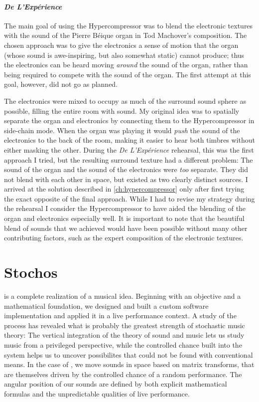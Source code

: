 \paragraph{\textit{De L'Exp\'{e}rience}}
The main goal of using the Hypercompressor was to blend the electronic
textures with the sound of the Pierre B\'{e}ique organ in Tod
Machover's composition. The chosen approach was to give the
electronics a sense of motion that the organ (whose sound is
awe-inspiring, but also somewhat static) cannot produce; thus the
electronics can be heard moving \emph{around} the sound of the organ,
rather than being required to compete with the sound of the organ.
The first attempt at this goal, however, did not go as planned.

The electronics were mixed to occupy as much of the surround sound
sphere as possible, filling the entire room with sound.  My original
idea was to spatially separate the organ and electronics by connecting
them to the Hypercompressor in side-chain mode.  When the organ was
playing it would \emph{push} the sound of the electronics to the back
of the room, making it easier to hear both timbres without either
masking the other.  During the \textit{De L'Exp\'{e}rience} rehearsal,
this was the first approach I tried, but the resulting surround
texture had a different problem: The sound of the organ and the sound
of the electronics were \emph{too} separate. They did not blend with
each other in space, but existed as two clearly distinct sources. I
arrived at the solution described in \autoref{ch:hypercompressor} only
after first trying the exact opposite of the final approach. While I
had to revise my strategy during the rehearsal I consider the
Hypercompressor to have aided the blending of the organ and
electronics especially well. It is important to note that the
beautiful blend of sounds that we achieved would have been possible
without many other contributing factors, such as the expert
composition of the electronic textures.


\section{Stochos}
\thesis is a complete realization of a musical idea. Beginning with an
objective and a mathematical foundation, we designed and built a custom
software implementation and applied it in a live performance
context. A study of the process has revealed what is probably the
greatest strength of stochastic music theory: The vertical integration
of the theory of sound and music lets us study music from a privileged
perspective, while the controlled chance built into the system helps
us to uncover possibilites that could not be found with conventional
means. In the case of \thesis, we move sounds in space based on matrix
transforms, that are themselves driven by the controlled chance of a
random performance. The angular position of our sounds are defined by
both explicit mathematical formulas and the unpredictable qualities of
live performance.

